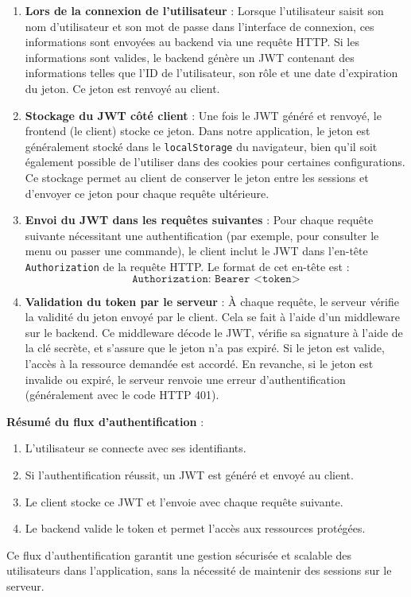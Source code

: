 \begin{enumerate}
    \item \textbf{Lors de la connexion de l’utilisateur} : Lorsque l’utilisateur saisit son nom d'utilisateur et son mot de passe dans l'interface de connexion, ces informations sont envoyées au backend via une requête HTTP. Si les informations sont valides, le backend génère un JWT contenant des informations telles que l'ID de l'utilisateur, son rôle et une date d’expiration du jeton. Ce jeton est renvoyé au client.
    
    \item \textbf{Stockage du JWT côté client} : Une fois le JWT généré et renvoyé, le frontend (le client) stocke ce jeton. Dans notre application, le jeton est généralement stocké dans le \texttt{localStorage} du navigateur, bien qu'il soit également possible de l'utiliser dans des cookies pour certaines configurations. Ce stockage permet au client de conserver le jeton entre les sessions et d'envoyer ce jeton pour chaque requête ultérieure.
    
    \item \textbf{Envoi du JWT dans les requêtes suivantes} : Pour chaque requête suivante nécessitant une authentification (par exemple, pour consulter le menu ou passer une commande), le client inclut le JWT dans l’en-tête \texttt{Authorization} de la requête HTTP. Le format de cet en-tête est :
    \[
    \texttt{Authorization: Bearer <token>}
    \]
    
    \item \textbf{Validation du token par le serveur} : À chaque requête, le serveur vérifie la validité du jeton envoyé par le client. Cela se fait à l'aide d'un middleware sur le backend. Ce middleware décode le JWT, vérifie sa signature à l'aide de la clé secrète, et s'assure que le jeton n’a pas expiré. Si le jeton est valide, l'accès à la ressource demandée est accordé. En revanche, si le jeton est invalide ou expiré, le serveur renvoie une erreur d'authentification (généralement avec le code HTTP 401).
\end{enumerate}

\textbf{Résumé du flux d'authentification} :
\begin{enumerate}
    \item L'utilisateur se connecte avec ses identifiants.
    \item Si l'authentification réussit, un JWT est généré et envoyé au client.
    \item Le client stocke ce JWT et l'envoie avec chaque requête suivante.
    \item Le backend valide le token et permet l'accès aux ressources protégées.
\end{enumerate}

Ce flux d’authentification garantit une gestion sécurisée et scalable des utilisateurs dans l'application, sans la nécessité de maintenir des sessions sur le serveur.

